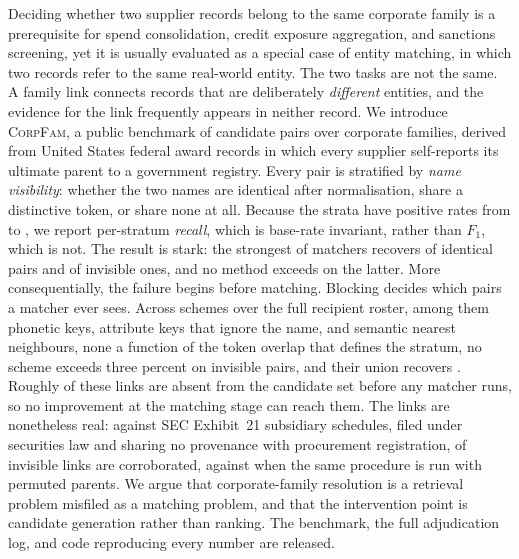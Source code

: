 Deciding whether two supplier records belong to the same corporate family is a
prerequisite for spend consolidation, credit exposure aggregation, and sanctions
screening, yet it is usually evaluated as a special case of entity matching, in which
two records refer to the same real-world entity. The two tasks are not the same. A
family link connects records that are deliberately \emph{different} entities, and the
evidence for the link frequently appears in neither record. We introduce
\textsc{CorpFam}, a public benchmark of \BenchPairs candidate pairs over \BenchFamilies
corporate families, derived from \ArchiveRows United States federal award records in
which every supplier self-reports its ultimate parent to a government registry. Every
pair is stratified by \emph{name visibility}: whether the two names are identical after
normalisation, share a distinctive token, or share none at all. Because the strata have
positive rates from \BaseVisibleRate to \BaseIdenticalRate, we report per-stratum
\emph{recall}, which is base-rate invariant, rather than $F_1$, which is not.
The result is stark: the strongest of \NumMethods matchers recovers
\BestRecallIdentical of identical pairs and \BestRecallInvisible of invisible ones, and
no method exceeds \AnyInvisibleRecallMax on the latter. More consequentially, the
failure begins before matching. Blocking decides which pairs a matcher ever sees. Across
\BlkNumSchemes schemes over the full recipient roster, among them phonetic keys,
attribute keys that ignore the name, and semantic nearest neighbours, none a function of
the token overlap that defines the stratum, no scheme exceeds three percent on invisible
pairs, and their union recovers \BlkUnionInvisible. Roughly
\BlkInvisibleLost of these links are absent from the candidate set before any matcher
runs, so no improvement at the matching stage can reach them. The links are nonetheless
real: against SEC Exhibit~21 subsidiary schedules, filed under securities law and
sharing no provenance with procurement registration, \EdgarInvisibleConfirmPct of
invisible links are corroborated, against \EdgarRandomParentPct when the same procedure
is run with permuted parents. We argue that corporate-family resolution is a retrieval
problem misfiled as a matching problem, and that the intervention point is candidate
generation rather than ranking. The benchmark, the full adjudication log, and code
reproducing every number are released.
